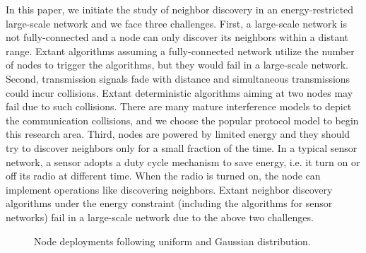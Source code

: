 In this paper, we initiate the study of neighbor discovery in an energy-restricted large-scale network and we face three challenges. First, a large-scale network is not fully-connected and a node can only discover its neighbors within a distant range. Extant algorithms assuming a fully-connected network utilize the number of nodes to trigger the algorithms, but they would fail in a large-scale network. Second, transmission signals fade with distance and simultaneous transmissions could incur collisions. Extant deterministic algorithms aiming at two nodes may fail due to such collisions. There are many mature interference models to depict the communication collisions, and we choose the popular protocol model\cite{clark1990unit} to begin this research area. Third, nodes are powered by limited energy and they should try to discover neighbors only for a small fraction of the time. In a typical sensor network\cite{akyildiz2002wireless}, a sensor adopts a duty cycle mechanism to save energy, i.e. it turn on or off its radio at different time. When the radio is turned on, the node can implement operations like discovering neighbors. Extant neighbor discovery algorithms under the energy constraint (including the algorithms for sensor networks) fail in a large-scale network due to the above two challenges.

\begin{figure}[!t]
\centering
{}
\vspace{0.03in}
\caption{Node deployments following uniform and Gaussian distribution.}
\label{distribution}
\end{figure}


